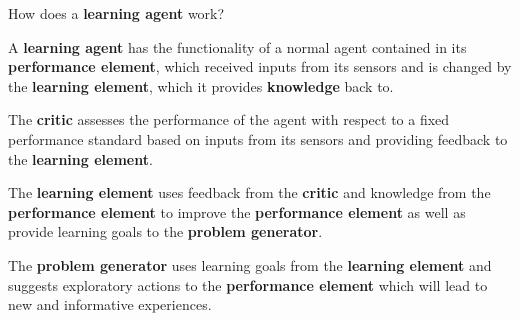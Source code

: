 \begin{flashcard}[Question]{How does a \textbf{learning agent} work?}
\begin{center}
A \textbf{learning agent} has the functionality of a normal agent contained in its \textbf{performance element}, which received inputs from its sensors and is changed by the \textbf{learning element}, which it provides \textbf{knowledge} back to.

\medskip

The \textbf{critic} assesses the performance of the agent with respect to a fixed performance standard based on inputs from its sensors and providing feedback to the \textbf{learning element}.

\medskip

The \textbf{learning element} uses feedback from the \textbf{critic} and knowledge from the \textbf{performance element} to improve the \textbf{performance element} as well as provide learning goals to the \textbf{problem generator}.

\medskip

The \textbf{problem generator} uses learning goals from the \textbf{learning element} and suggests exploratory actions to the \textbf{performance element} which will lead to new and informative experiences.
\end{center}
\end{flashcard}
